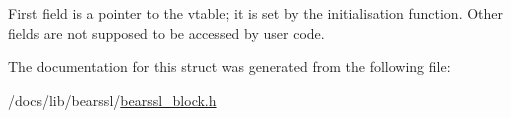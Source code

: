 First field is a pointer to the vtable; it is set by the initialisation function. Other fields are not supposed to be accessed by user code. 

The documentation for this struct was generated from the following file\+:\begin{DoxyCompactItemize}
\item 
/docs/lib/bearssl/\hyperlink{bearssl__block_8h}{bearssl\+\_\+block.\+h}\end{DoxyCompactItemize}
